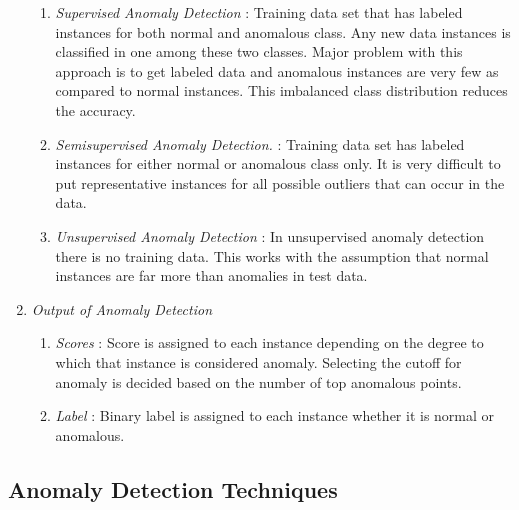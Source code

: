 \begin{enumerate}
	\begin{enumerate}
		
		\item \textit{Supervised Anomaly Detection} : Training data set that has labeled instances for both normal and anomalous class. Any new data instances is classified in one among these two classes. Major problem with this approach is to get labeled data and anomalous instances are very few as compared to normal instances. This imbalanced class distribution reduces the accuracy. 
		
		\item \textit{Semisupervised Anomaly Detection.} : Training data set has labeled instances for either normal or anomalous class only. It is very difficult to put representative instances for all possible outliers that can occur in the data.
		
		\item \textit{Unsupervised Anomaly Detection} : In unsupervised anomaly detection there is no training data. This works with the assumption that normal instances are far more than anomalies in test data.   
	\end{enumerate}
	
	
	\item \textit{Output of Anomaly Detection}
	
	\begin{enumerate}
		\item \textit{Scores} : Score is assigned to each instance depending on the degree to which that instance is considered anomaly. Selecting the cutoff for anomaly is decided based on the number of top anomalous points.
		
		\item \textit{Label} : Binary label is assigned to each instance whether it is normal or anomalous.
	\end{enumerate} 
	
	
\end{enumerate}




\subsection{Anomaly Detection Techniques} 

